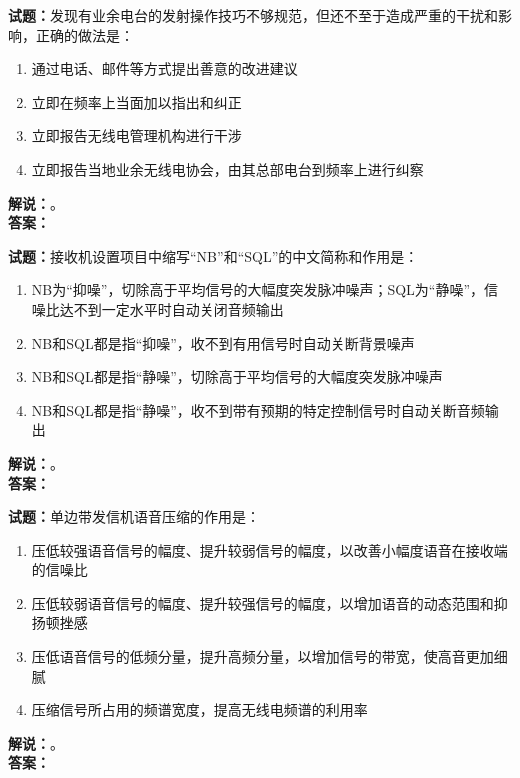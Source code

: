 \documentclass{ctexbook}
\begin{document}
\vspace{\baselineskip}

\noindent\textbf{试题：}发现有业余电台的发射操作技巧不够规范，但还不至于造成严重的干扰和影响，正确的做法是：
\begin{enumerate}[leftmargin=3em]
  \item 通过电话、邮件等方式提出善意的改进建议
  \item 立即在频率上当面加以指出和纠正
  \item 立即报告无线电管理机构进行干涉
  \item 立即报告当地业余无线电协会，由其总部电台到频率上进行纠察
\end{enumerate}
\noindent\textbf{解说：}\textbf{}。\\\noindent\textbf{答案：}

\vspace{\baselineskip}

\noindent\textbf{试题：}接收机设置项目中缩写“NB”和“SQL”的中文简称和作用是：
\begin{enumerate}[leftmargin=3em]
  \item NB为“抑噪”，切除高于平均信号的大幅度突发脉冲噪声；SQL为“静噪”，信噪比达不到一定水平时自动关闭音频输出
  \item NB和SQL都是指“抑噪”，收不到有用信号时自动关断背景噪声
  \item NB和SQL都是指“静噪”，切除高于平均信号的大幅度突发脉冲噪声
  \item NB和SQL都是指“静噪”，收不到带有预期的特定控制信号时自动关断音频输出
\end{enumerate}
\noindent\textbf{解说：}\textbf{}。\\\noindent\textbf{答案：}

\vspace{\baselineskip}

\noindent\textbf{试题：}单边带发信机语音压缩的作用是：
\begin{enumerate}[leftmargin=3em]
  \item 压低较强语音信号的幅度、提升较弱信号的幅度，以改善小幅度语音在接收端的信噪比
  \item 压低较弱语音信号的幅度、提升较强信号的幅度，以增加语音的动态范围和抑扬顿挫感
  \item 压低语音信号的低频分量，提升高频分量，以增加信号的带宽，使高音更加细腻
  \item 压缩信号所占用的频谱宽度，提高无线电频谱的利用率
\end{enumerate}
\noindent\textbf{解说：}\textbf{}。\\\noindent\textbf{答案：}
\end{document}
